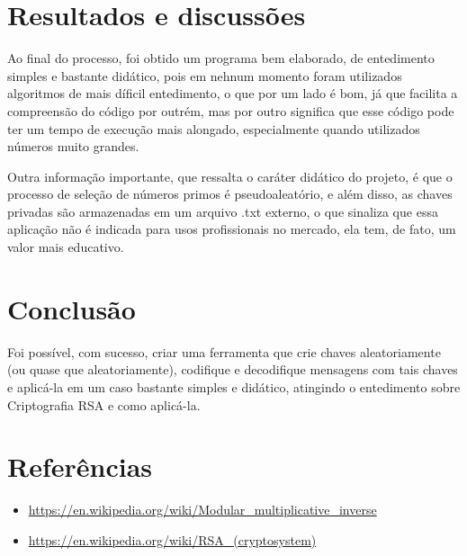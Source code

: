 \documentclass[12pt,A4]{report}
\begin{document}
\section{Resultados e discussões}
Ao final do processo, foi obtido um programa bem elaborado, de entedimento simples e bastante didático, pois em nehnum momento foram utilizados algoritmos de mais díficil entedimento, o que por um lado é bom, já que facilita a compreensão do código por outrém, mas por outro significa que esse código pode ter um tempo de execução mais alongado, especialmente quando utilizados números muito grandes.

Outra informação importante, que ressalta o caráter didático do projeto, é que o processo de seleção de números primos é pseudoaleatório, e além disso, as chaves privadas são armazenadas em um arquivo .txt externo, o que sinaliza que essa aplicação não é indicada para usos profissionais no mercado, ela tem, de fato, um valor mais educativo.

\section{Conclusão}
Foi possível, com sucesso, criar uma ferramenta que crie chaves aleatoriamente (ou quase que aleatoriamente), codifique e decodifique mensagens com tais chaves e aplicá-la em um caso bastante simples e didático, atingindo o entedimento sobre Criptografia RSA e como aplicá-la.

\section{Referências}
\begin{itemize}
    \item \url{https://en.wikipedia.org/wiki/Modular_multiplicative_inverse}
    \item \url{https://en.wikipedia.org/wiki/RSA_(cryptosystem)}
\end{itemize}
\end{document}
